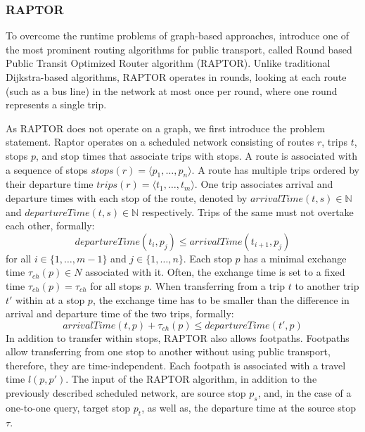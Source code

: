 \subsubsection{RAPTOR}
\label{subsubsec:raptor}

To overcome the runtime problems of graph-based approaches, \cite{dellingRoundBasedPublicTransit2015} introduce one of the most prominent routing algorithms for public transport, called Round based Public Transit Optimized Router algorithm (RAPTOR). %
Unlike traditional Dijkstra-based algorithms, RAPTOR operates in rounds, looking at each route (such as a bus line) in the network at most once per round, where one round represents a single trip.

As RAPTOR does not operate on a graph, we first introduce the problem statement.
Raptor operates on a scheduled network consisting of routes \(r\), trips \(t\), stops \(p\), and stop times that associate trips with stops.
A route is associated with a sequence of stops \(stops(r) = \langle p_1, \dots, p_n \rangle\).
A route has multiple trips ordered by their departure time \(trips(r) = \langle t_1, \dots, t_m \rangle\).
One trip associates arrival and departure times with each stop of the route, denoted by \(arrivalTime(t, s) \in \mathbb{N}\) and \(departureTime(t, s) \in \mathbb{N}\) respectively.
Trips of the same must not overtake each other, formally:
\[departureTime(t_i, p_j) \leq arrivalTime(t_{i+1}, p_j)\]
for all \(i \in \{1, \dots, m-1\}\) and \(j \in \{1, \dots, n\}\).
Each stop \(p\) has a minimal exchange time \(\tau_{ch}(p) \in N\) associated with it.
Often, the exchange time is set to a fixed time \(\tau_{ch}(p) = \tau_{ch}\) for all stops \(p\).
When transferring from a trip \(t\) to another trip \(t'\) within at a stop \(p\), the exchange time has to be smaller than the difference in arrival and departure time of the two trips, formally:
\[arrivalTime(t, p) + \tau_{ch}(p) \leq departureTime(t', p) \]
In addition to transfer within stops, RAPTOR also allows footpaths.
Footpaths allow transferring from one stop to another without using public transport, therefore, they are time-independent.
Each footpath is associated with a travel time \(l(p, p')\).
The input of the RAPTOR algorithm, in addition to the previously described scheduled network, are source stop \(p_s\), and, in the case of a one-to-one query, target stop \(p_t\), as well as, the departure time at the source stop \(\tau\).


